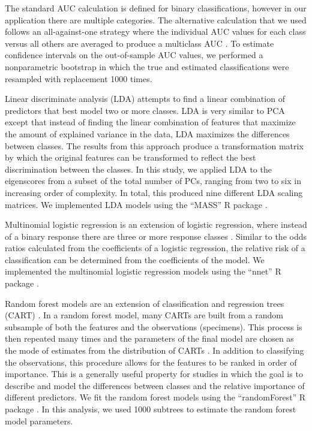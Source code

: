 \documentclass[12pt,letterpaper]{article}
\begin{document}
The standard AUC calculation is defined for binary classifications, however in our application there are multiple categories. The alternative calculation that we used follows an all-against-one strategy where the individual AUC values for each class versus all others are averaged to produce a multiclass AUC \citep{Hand2001}. To estimate confidence intervals on the out-of-sample AUC values, we performed a nonparametric bootstrap in which the true and estimated classifications were resampled with replacement 1000 times.

Linear discriminate analysis (LDA) attempts to find a linear combination of predictors that best model two or more classes. LDA is very similar to PCA except that instead of finding the linear combination of features that maximize the amount of explained variance in the data, LDA maximizes the differences between classes. The results from this approach produce a transformation matrix by which the original features can be transformed to reflect the best discrimination between the classes. In this study, we applied LDA to the eigenscores from a subset of the total number of PCs, ranging from two to six in increasing order of complexity. In total, this produced nine different LDA scaling matrices. We implemented LDA models using the ``MASS'' R package \citep{Venables2002a}. 

Multinomial logistic regression is an extension of logistic regression, where instead of a binary response there are three or more response classes \citep{Venables2002a}. Similar to the odds ratios calculated from the coefficients of a logistic regression, the relative risk of a classification can be determined from the coefficients of the model. We implemented the multinomial logistic regression models using the ``nnet'' R package \citep{Venables2002a}.

Random forest models are an extension of classification and regression trees (CART) \citep{Breiman1984,Breiman2001}. In a random forest model, many CARTs are built from a random subsample of both the features and the observations (specimens). This process is then repeated many times and the parameters of the final model are chosen as the mode of estimates from the distribution of CARTs \citep{Breiman2001}. In addition to classifying the observations, this procedure allows for the features to be ranked in order of importance. This is a generally useful property for studies in which the goal is to describe and model the differences between classes and the relative importance of different predictors. We fit the random forest models using the ``randomForest'' R package \citep{Liaw2002}. In this analysis, we used 1000 subtrees to estimate the random forest model parameters. 
\end{document}
